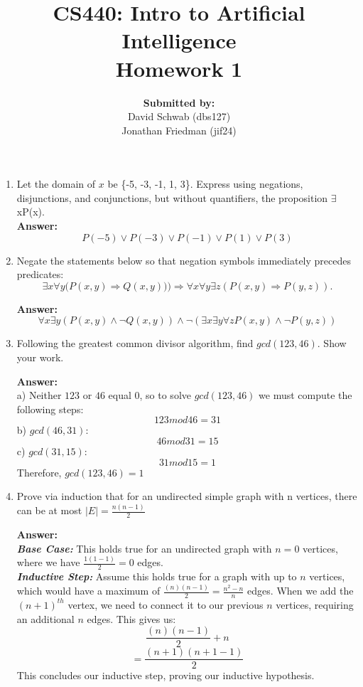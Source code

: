 \documentclass[a4paper,12pt]{article}
\begin{document}
\title{CS440: Intro to Artificial Intelligence \\
	\large Homework 1}
\author{\textbf{Submitted by:} \\David Schwab (dbs127) \\ Jonathan Friedman (jif24)}
\maketitle

\begin{enumerate}
\item 
Let the domain of $x$ be \{-5, -3, -1, 1, 3\}. Express using negations, disjunctions, and conjunctions, but without quantifiers, the proposition {$\exists$xP(x)}. \\ 
	
	\textbf{Answer:}\\ 
		$$P(-5) \lor P(-3) \lor P(-1) \lor P(1) \lor P(3)$$


\item 
Negate the statements below so that negation symbols immediately precedes predicates: 
$$ {\exists x} {\forall y(P(x, y)} \Rightarrow Q(x, y))) \Rightarrow {\forall x} {\forall y} {\exists z}(P(x, y) \Rightarrow P(y, z)).$$
	
	\textbf{Answer:}  
		$$ {\forall x}{\exists y}(P(x,y) \land \neg Q(x,y)) \land \neg ({\exists x}{\exists y}{\forall z}P(x,y) \land \neg P(y,z)) $$
	
\item 
Following the greatest common divisor algorithm, find $gcd(123, 46)$. Show your work.

	\textbf{Answer:} \\ 
		a) Neither $123$ or $46$ equal $0$, so to solve $gcd(123, 46)$ we must compute the following steps: \\
			$$ 123 mod 46 = 31 $$
		b) $gcd(46, 31): $
				$$ 46  mod  31 = 15 $$
		c)  $ gcd(31, 15): $			
				$$ 31 mod 15 = 1 $$
			Therefore, $gcd(123, 46) = 1$

\item 
Prove via induction that for an undirected simple graph with n vertices, there can be at most $|E| = \frac{n(n-1) }{2}$
	
	\textbf{Answer:}\\ 
		\textbf{\textit{Base Case:}} This holds true for an undirected graph with $n=0$ vertices, where we have $\frac{1(1-1)}{2} = 0$ edges. \\
		\textbf{\textit{Inductive Step:}} Assume this holds true for a graph with up to $n$ vertices, which would have a maximum of $\frac{(n)(n-1)}{2} = \frac{n^2-n}{n}$ edges. 
					When we add the $(n+1)^{th}$ vertex, we need to connect it to our previous $n$ vertices, requiring an additional  $n$ edges. This gives us:
					$$\frac{(n)(n-1)}{2} + n $$
					$$= \frac{(n+1)(n+1-1)}{2}$$ 
				This concludes our inductive step, proving our inductive hypothesis.


\end{enumerate}
\end{document}
